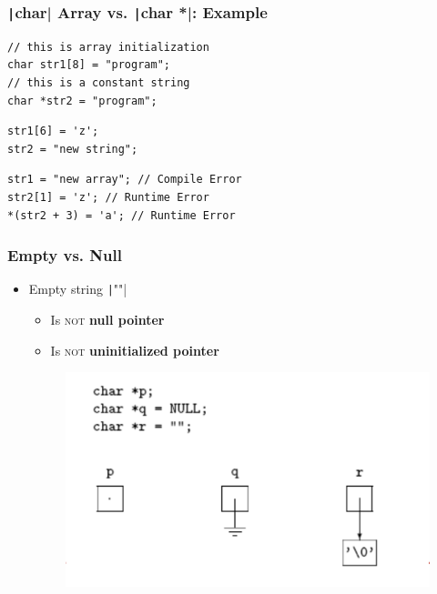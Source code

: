 \documentclass{../c-lecture}
\begin{document}
\begin{frame}[fragile]
  \frametitle{\texttt|char| Array vs. \texttt|char *|: Example}
  \begin{verbatim}
// this is array initialization
char str1[8] = "program";
// this is a constant string
char *str2 = "program";
  \end{verbatim}
  \begin{verbatim}
str1[6] = 'z';
str2 = "new string";
  \end{verbatim}
  \begin{verbatim}
str1 = "new array"; // Compile Error
str2[1] = 'z'; // Runtime Error
*(str2 + 3) = 'a'; // Runtime Error
  \end{verbatim}
\end{frame}

\begin{frame}[fragile]
  \frametitle{Empty vs. Null}
  \begin{itemize}
    \item Empty string \texttt|""|
    \begin{itemize}
      \item Is \textsc{\color{RubineRed} not} \textbf{\color{YellowOrange} null pointer}
      \item Is \textsc{\color{RubineRed} not} \textbf{\color{LimeGreen} uninitialized pointer}
    \end{itemize}
    \begin{figure}
      \includegraphics[height=.75\textheight]{img/null-empty-string.png}
    \end{figure}
  \end{itemize}
\end{frame}
\end{document}
